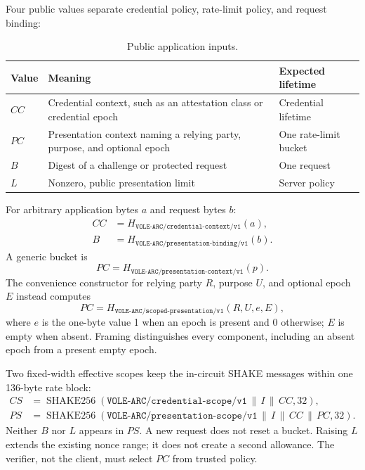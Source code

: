 \documentclass[11pt]{article}
\newcommand{\concat}{\,\|\,}
\newcommand{\XOF}{\operatorname{SHAKE256}}
\newcommand{\domain}[1]{\texttt{#1}}
\theoremstyle{remark}
\begin{document}
Four public values separate credential policy, rate-limit policy, and request
binding:

\begin{table}[H]
  \centering
  \caption{Public application inputs.}
  \begin{tabularx}{\textwidth}{@{}lXl@{}}
    \toprule
    Value & Meaning & Expected lifetime \\
    \midrule
    $CC$ & Credential context, such as an attestation class or credential
      epoch & Credential lifetime \\
    $PC$ & Presentation context naming a relying party, purpose, and optional
      epoch & One rate-limit bucket \\
    $B$ & Digest of a challenge or protected request & One request \\
    $L$ & Nonzero, public presentation limit & Server policy \\
    \bottomrule
  \end{tabularx}
\end{table}

For arbitrary application bytes $a$ and request bytes $b$:
\begin{align*}
  CC &= H_{\domain{VOLE-ARC/credential-context/v1}}(a),\\
  B  &= H_{\domain{VOLE-ARC/presentation-binding/v1}}(b).
\end{align*}
A generic bucket is
\[
  PC = H_{\domain{VOLE-ARC/presentation-context/v1}}(p).
\]
The convenience constructor for relying party $R$, purpose $U$, and optional
epoch $E$ instead computes
\[
  PC = H_{\domain{VOLE-ARC/scoped-presentation/v1}}(R,U,e,E),
\]
where $e$ is the one-byte value 1 when an epoch is present and 0 otherwise;
$E$ is empty when absent. Framing distinguishes every component, including
an absent epoch from a present empty epoch.

Two fixed-width effective scopes keep the in-circuit SHAKE messages within
one 136-byte rate block:
\begin{align*}
  CS &= \XOF(\domain{VOLE-ARC/credential-scope/v1}
             \concat I \concat CC,32),\\
  PS &= \XOF(\domain{VOLE-ARC/presentation-scope/v1}
             \concat I \concat CC \concat PC,32).
\end{align*}
Neither $B$ nor $L$ appears in $PS$. A new request does not reset a bucket.
Raising $L$ extends the existing nonce range; it does not create a second
allowance. The verifier, not the client, must select $PC$ from trusted policy.
\end{document}
